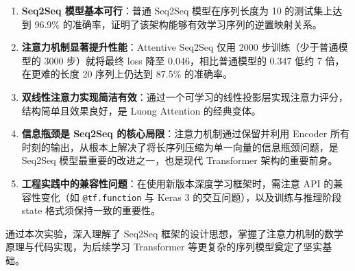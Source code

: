 \documentclass[12pt, a4paper]{article}
\begin{document}
\begin{enumerate}
    \item \textbf{Seq2Seq 模型基本可行}：普通 Seq2Seq 模型在序列长度为 10 的测试集上达到 96.9\% 的准确率，证明了该架构能够有效学习序列的逆置映射关系。

    \item \textbf{注意力机制显著提升性能}：Attentive Seq2Seq 仅用 2000 步训练（少于普通模型的 3000 步）就将最终 loss 降至 0.046，相比普通模型的 0.347 低约 7 倍，在更难的长度 20 序列上仍达到 87.5\% 的准确率。

    \item \textbf{双线性注意力实现简洁有效}：通过一个可学习的线性投影层实现注意力评分，结构简单且效果良好，是 Luong Attention 的经典变体。

    \item \textbf{信息瓶颈是 Seq2Seq 的核心局限}：注意力机制通过保留并利用 Encoder 所有时刻的输出，从根本上解决了将长序列压缩为单一向量的信息瓶颈问题，是 Seq2Seq 模型最重要的改进之一，也是现代 Transformer 架构的重要前身。

    \item \textbf{工程实践中的兼容性问题}：在使用新版本深度学习框架时，需注意 API 的兼容性变化（如 \texttt{@tf.function} 与 Keras 3 的交互问题），以及训练与推理阶段 state 格式须保持一致的重要性。
\end{enumerate}

通过本次实验，深入理解了 Seq2Seq 框架的设计思想，掌握了注意力机制的数学原理与代码实现，为后续学习 Transformer 等更复杂的序列模型奠定了坚实基础。
\end{document}
